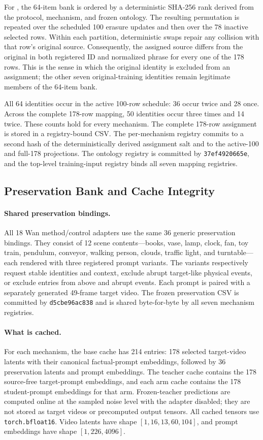 For \methodshort, the 64-item bank is ordered by a deterministic SHA-256 rank
derived from the protocol, mechanism, and frozen ontology.  The resulting
permutation is repeated over the scheduled 100 erasure updates and then over
the 78 inactive selected rows.  Within each partition, deterministic swaps
repair any collision with that row's original source.  Consequently, the
assigned source differs from the original in both registered ID and normalized
phrase for every one of the 178 rows.  This is the sense in which the original
identity is excluded from an assignment; the other seven original-training
identities remain legitimate members of the 64-item bank.

All 64 identities occur in the active 100-row schedule: 36 occur twice and 28
once. Across the complete 178-row mapping, 50 identities occur three times
and 14 twice. These counts hold for every mechanism. The complete 178-row
assignment is stored in a registry-bound CSV. The per-mechanism registry
commits to a second hash of the deterministically derived assignment salt and
to the active-100 and full-178 projections. The ontology
registry is committed by
\texttt{37ef4920665e},
and the top-level training-input registry binds all seven mapping registries.

\subsection{Preservation Bank and Cache Integrity}
\label{app:preservation-data}

\paragraph{Shared preservation bindings.}
All 18 Wan method/control adapters use the same 36 generic preservation
bindings.  They consist of
12 scene contents---books, vase, lamp, clock, fan, toy train, pendulum,
conveyor, walking person, clouds, traffic light, and turntable---each rendered
with three registered prompt variants.  The variants respectively request
stable identities and context, exclude abrupt target-like physical events,
or exclude entries from above and abrupt events.  Each prompt is paired with
a separately generated 49-frame target video.  The frozen preservation CSV is
committed by
\texttt{d5cbe96ac838}
and is shared byte-for-byte by all seven mechanism registries.

\paragraph{What is cached.}
For each mechanism, the base cache has 214 entries: 178 selected target-video
latents with their canonical factual-prompt embeddings, followed by 36
preservation latents and prompt embeddings.  The teacher cache contains the
178 source-free target-prompt embeddings, and each arm cache contains the 178
student-prompt embeddings for that arm.  Frozen-teacher predictions are
computed online at the sampled noise level with the adapter disabled; they are
not stored as target videos or precomputed output tensors.  All cached tensors
use \texttt{torch.bfloat16}.  Video latents have shape
\([1,16,13,60,104]\), and prompt embeddings have shape
\([1,226,4096]\).

